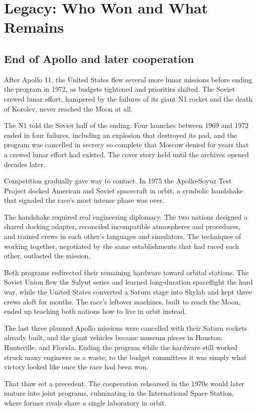 \section{Legacy: Who Won and What Remains}

\subsection{End of Apollo and later cooperation}
After Apollo 11, the United States flew several more lunar missions before ending the program in 1972, as budgets tightened and priorities shifted. The Soviet crewed lunar effort, hampered by the failures of its giant N1 rocket and the death of Korolev, never reached the Moon at all.

The N1 told the Soviet half of the ending. Four launches between 1969 and 1972 ended in four failures, including an explosion that destroyed its pad, and the program was cancelled in secrecy so complete that Moscow denied for years that a crewed lunar effort had existed. The cover story held until the archives opened decades later.

Competition gradually gave way to contact. In 1975 the Apollo-Soyuz Test Project docked American and Soviet spacecraft in orbit, a symbolic handshake that signaled the race's most intense phase was over.

The handshake required real engineering diplomacy. The two nations designed a shared docking adapter, reconciled incompatible atmospheres and procedures, and trained crews in each other's languages and simulators. The techniques of working together, negotiated by the same establishments that had raced each other, outlasted the mission.

Both programs redirected their remaining hardware toward orbital stations. The Soviet Union flew the Salyut series and learned long-duration spaceflight the hard way, while the United States converted a Saturn stage into Skylab and kept three crews aloft for months. The race's leftover machines, built to reach the Moon, ended up teaching both nations how to live in orbit instead.

The last three planned Apollo missions were cancelled with their Saturn rockets already built, and the giant vehicles became museum pieces in Houston, Huntsville, and Florida. Ending the program while the hardware still worked struck many engineers as a waste; to the budget committees it was simply what victory looked like once the race had been won.

That thaw set a precedent. The cooperation rehearsed in the 1970s would later mature into joint programs, culminating in the International Space Station, where former rivals share a single laboratory in orbit. \cite{nasa2019} \cite{siddiqi2010} \cite{cadbury2006}

